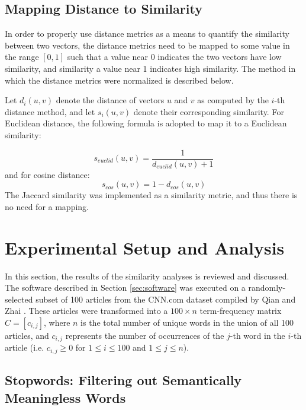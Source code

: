 \documentclass[11pt]{article}
\begin{document}
\subsection{Mapping Distance to Similarity} \label{sec:mapping}

In order to properly use distance metrics as a means to quantify the similarity between two vectors, the distance metrics need to be mapped to some value in the range $[0, 1]$ such that a value near 0 indicates the two vectors have low similarity, and similarity a value near 1 indicates high similarity.
The method in which the distance metrics were normalized is described below.

Let $d_i(u, v)$ denote the distance of vectors $u$ and $v$ as computed by the $i$-th distance method, and let $s_i(u, v)$ denote their corresponding similarity.
For Euclidean distance, the following formula is adopted to map it to a Euclidean similarity:

\begin{equation} \label{eq:euclid}
s_{euclid}(u, v) = \frac{1}{d_{euclid}(u, v) + 1}
\end{equation}
and for cosine distance:
\begin{equation} \label{eq:cosine}
s_{cos}(u, v) = 1 - d_{cos}(u, v)
\end{equation}
The Jaccard similarity was implemented as a similarity metric, and thus there is no need for a mapping.


\section{Experimental Setup and Analysis}

In this section, the results of the similarity analyses is reviewed and discussed.
The software described in Section \ref{sec:software} was executed on a randomly-selected subset of 100 articles from the CNN.com dataset compiled by Qian and Zhai \cite{qian2014unsupervised}.
These articles were transformed into a $100 \times n$ term-frequency matrix $C = [ c_{i,j} ]$, where $n$ is the total number of unique words in the union of all 100 articles, and $c_{i,j}$ represents the number of occurrences of the $j$-th word in the $i$-th article (i.e. $c_{i,j} \ge 0$ for $1 \le i \le 100$ and $1 \le j \le n$).

\subsection{Stopwords: Filtering out Semantically Meaningless Words}
\end{document}
